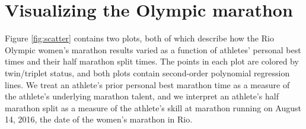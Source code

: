 \documentclass[12pt,titlepage]{article}
\begin{document}
\section*{Visualizing the Olympic marathon}

Figure \ref{fig:scatter} contains two plots, both of which describe
how the Rio Olympic women's marathon results varied as a function of
athletes' personal best times and their half marathon split times.
The points in each plot are colored by twin/triplet status, and both
plots contain second-order polynomial regression lines.  We treat an
athlete's prior personal best marathon time as a measure of the
athlete's underlying marathon talent, and we interpret an athlete's
half marathon split as a measure of the athlete's skill at marathon
running on August 14, 2016, the date of the women's marathon in Rio.
\end{document}
